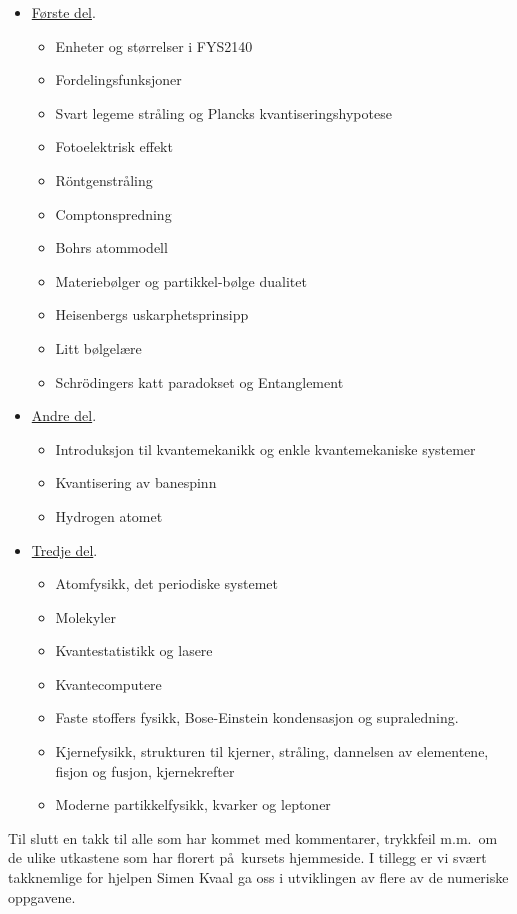 \begin{itemize}
   \item \underline{F\o rste del}.
        \begin{itemize}
           \item Enheter og st\o rrelser i FYS2140
           \item Fordelingsfunksjoner
           \item Svart legeme str\aa ling og Plancks kvantiseringshypotese
           \item Fotoelektrisk effekt
           \item R\"ontgenstr\aa ling
           \item Comptonspredning
           \item Bohrs atommodell
           \item Materieb\o lger og partikkel-b\o lge dualitet
           \item Heisenbergs uskarphetsprinsipp
           \item Litt b\o lgel\ae re
           \item Schr\"odingers katt paradokset og Entanglement
         \end{itemize}
      \item \underline{Andre del}.
        \begin{itemize}
           \item Introduksjon til kvantemekanikk og enkle
                 kvantemekaniske systemer
           \item Kvantisering av banespinn
           \item Hydrogen atomet
        \end{itemize}
      \item \underline{Tredje del}.
        \begin{itemize}
           \item Atomfysikk, det periodiske systemet
           \item Molekyler
           \item Kvantestatistikk og lasere
           \item Kvantecomputere
           \item Faste stoffers fysikk, Bose-Einstein kondensasjon 
                 og supraledning.
           \item Kjernefysikk, strukturen til kjerner, str\aa ling,
                 dannelsen av elementene, fisjon og fusjon, kjernekrefter
           \item Moderne partikkelfysikk, kvarker og leptoner
         \end{itemize}
      \end{itemize}





Til slutt en takk til alle som har kommet med kommentarer, trykkfeil
m.m.~om de ulike utkastene som har florert p\aa\ kursets hjemmeside.
I tillegg er vi sv\ae rt takknemlige for hjelpen Simen Kvaal ga oss i
utviklingen av flere av de numeriske oppgavene.















